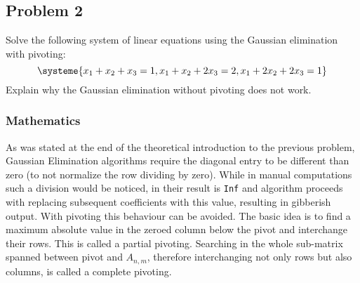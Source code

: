 \subsection{Problem 2}\label{problem:2}
Solve the following system of linear equations using the Gaussian elimination with pivoting:
\begin{equation*}
    \systeme{x_1+x_2+x_3=1,x_1+x_2+2x_3=2,x_1+2x_2+2x_3=1}
\end{equation*}
Explain why the Gaussian elimination without pivoting does not work.
\subsubsection*{Mathematics}
As was stated at the end of the theoretical introduction to the previous problem, Gaussian Elimination algorithms
require the diagonal entry to be different than zero (to not normalize the row dividing by zero). While in manual
computations such a division would be noticed, in \MATLAB their result is \texttt{Inf} and algorithm proceeds with
replacing subsequent coefficients with this value, resulting in gibberish output. With pivoting this behaviour can be
avoided. The basic idea is to find a maximum absolute value in the zeroed column below the pivot and interchange their
rows. This is called a partial pivoting. Searching in the whole sub-matrix spanned between pivot and $A_{n,m}$,
therefore interchanging not only rows but also columns, is called a complete pivoting.

